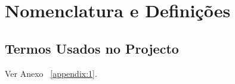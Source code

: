 \section{Nomenclatura e Definições}
\subsection{Termos Usados no Projecto}

    Ver Anexo ~\ref{appendix:1}.
